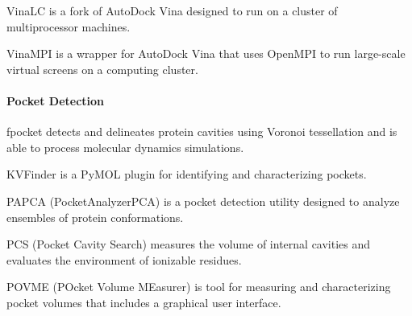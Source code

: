 VinaLC  \cite{Zhang_2013} is a fork of AutoDock Vina designed to run on a cluster of multiprocessor machines.

VinaMPI \cite{Ellingson_2013} is a wrapper for AutoDock Vina that uses OpenMPI to run large-scale virtual screens on a computing cluster.

\paragraph{Pocket Detection}

fpocket  \cite{Schmidtke_2011} detects and delineates protein cavities using Voronoi tessellation and is able to process molecular dynamics simulations.

KVFinder \cite{Oliveira_2014} is a PyMOL plugin for identifying and characterizing pockets.

PAPCA (PocketAnalyzerPCA) is a pocket detection utility designed to analyze ensembles of protein conformations.

PCS (Pocket Cavity Search) measures the volume of internal cavities and evaluates the environment of ionizable residues.

POVME (POcket Volume MEasurer) \cite{Durrant_2014} is tool for measuring and characterizing pocket volumes that includes a graphical user interface.


